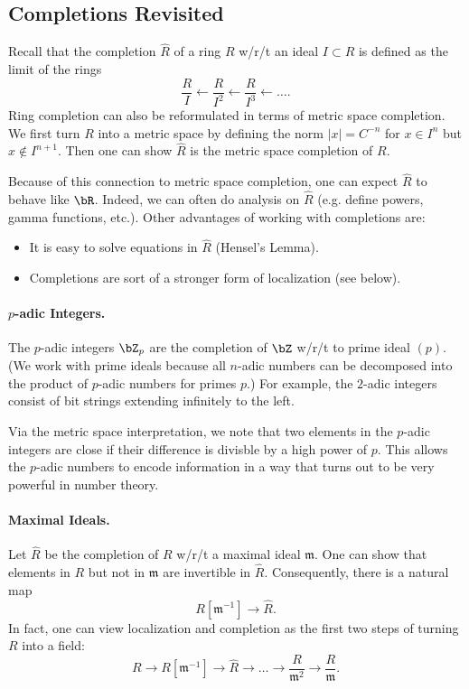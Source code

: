 \subsection{Completions Revisited}
Recall that the completion $\hat{R}$ of a ring $R$ w/r/t an ideal $I \subset R$ is defined as the limit of the rings
\[
    \frac{R}{I} \leftarrow \frac{R}{I^2} \leftarrow \frac{R}{I^3} \leftarrow \dots.
\]
Ring completion can also be reformulated in terms of metric space completion. We first turn $R$ into a metric space by defining the norm $|x| = C^{-n}$ for $x \in I^n$ but $x \not \in I^{n+1}$. Then one can show $\hat{R}$ is the metric space completion of $R$.

Because of this connection to metric space completion, one can expect $\hat{R}$ to behave like $\bR$. Indeed, we can often do analysis on $\hat{R}$ (e.g. define powers, gamma functions, etc.). Other advantages of working with completions are:
\begin{itemize}
    \item It is easy to solve equations in $\hat{R}$ (Hensel's Lemma).
    \item Completions are sort of a stronger form of localization (see below).
\end{itemize}

\paragraph{$p$-adic Integers.} The $p$-adic integers $\bZ_p$ are the completion of $\bZ$ w/r/t to prime ideal $(p)$. (We work with prime ideals because all $n$-adic numbers can be decomposed into the product of $p$-adic numbers for primes $p$.) For example, the $2$-adic integers consist of bit strings extending infinitely to the left.

Via the metric space interpretation, we note that two elements in the $p$-adic integers are close if their difference is divisble by a high power of $p$. This allows the $p$-adic numbers to encode information in a way that turns out to be very powerful in number theory.

\paragraph{Maximal Ideals.} Let $\hat{R}$ be the completion of $R$ w/r/t a maximal ideal $\mathfrak m$. One can show that elements in $R$ but not in $\mathfrak m$ are invertible in $\hat{R}$. Consequently, there is a natural map
\[
    R[\mathfrak m^{-1}] \to \hat{R}.
\]
In fact, one can view localization and completion as the first two steps of turning $R$ into a field:
\[
    R \to R[\mathfrak m^{-1}] \to \hat{R} \to \dots \to \frac{R}{\mathfrak m^2} \to \frac{R}{\mathfrak m}.
\]

